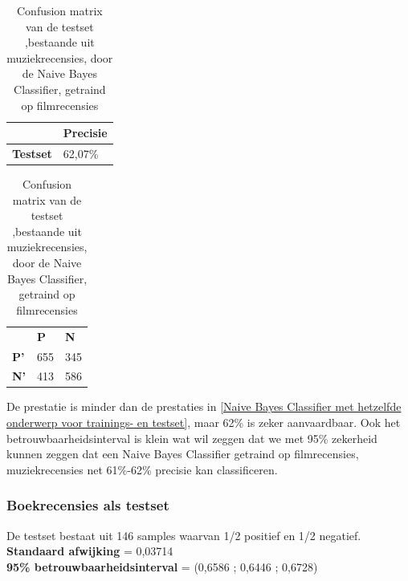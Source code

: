 \begin{table}[h]
\centering
\setlength\tabcolsep{4pt}
\begin{minipage}[t]{0.48\textwidth}
\centering
\begin{tabular}{l|l|}
\cline{2-2}
                                            & \textbf{Precisie} \\ \hline
\multicolumn{1}{|l|}{\textbf{Testset}}      & 62,07\%           \\ \hline
\end{tabular}
\caption{Classificatieprecisie Naive Bayes Classifier, getraind op filmrecensies, getest op muziekrecensies}
\end{minipage}%
\hfill
\begin{minipage}[t]{0.48\textwidth}
\centering
\begin{tabular}{lll}
                                 & \textbf{P}               & \textbf{N}               \\ \cline{2-3} 
\multicolumn{1}{l|}{\textbf{P'}} & \multicolumn{1}{l|}{655} & \multicolumn{1}{l|}{345} \\ \cline{2-3} 
\multicolumn{1}{l|}{\textbf{N'}} & \multicolumn{1}{l|}{413} & \multicolumn{1}{l|}{586} \\ \cline{2-3} 
\end{tabular}
\caption{Confusion matrix van de testset ,bestaande uit muziekrecensies, door de  Naive Bayes Classifier, getraind op filmrecensies} 
\end{minipage}
\end{table}

De prestatie is minder dan de prestaties in \ref{Naive Bayes Classifier met hetzelfde onderwerp voor trainings- en testset}, maar 62\% is zeker aanvaardbaar. Ook het betrouwbaarheidsinterval is klein wat wil zeggen dat we  met 95\% zekerheid kunnen zeggen dat een Naive Bayes Classifier getraind op filmrecensies, muziekrecensies net 61\%-62\% precisie kan classificeren.  

\subsubsection{Boekrecensies als testset}\label{Boekrecensies testset-movie}

De testset bestaat uit 146 samples waarvan 1/2 positief en 1/2 negatief.\\

\textbf{Standaard afwijking} = 0,03714\\
\textbf{95\% betrouwbaarheidsinterval} = (0,6586 ; 0,6446 ; 0,6728)\\
 
